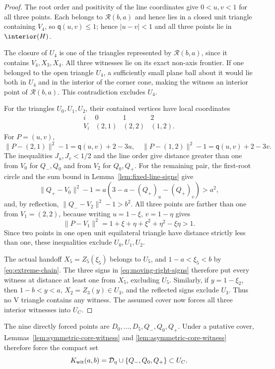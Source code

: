 \begin{proof}
The root order and positivity of the line coordinates give
$0<u,v<1$ for all three points.  Each belongs to $\mathcal R(b,a)$ and hence
lies in a closed unit triangle containing $V_4$, so
$\mathsf q(u,v)\le1$; hence
$|u-v|<1$ and all three points lie in $\interior(H)$.

The closure of $U_4$ is one of the triangles represented by
$\mathcal R(b,a)$, since it contains $V_4,X_3,X_4$.  All three witnesses lie
on its exact non-axis frontier.  If one belonged to the open triangle $U_4$,
a sufficiently small plane ball about it would lie both in $U_4$ and in the
interior of the corner cone, making the witness an interior point of
$\mathcal R(b,a)$.  This contradiction excludes $U_4$.

For the triangles $U_0,U_1,U_2$, their contained vertices have local coordinates
\[
 \begin{array}{c|ccc}
 i&0&1&2\\ \hline
 V_i&(2,1)&(2,2)&(1,2).
 \end{array}
\]
For $P=(u,v)$,
\[
 \lVert P-(2,1)\rVert^2-1=\mathsf q(u,v)+2-3u,
 \quad
 \lVert P-(1,2)\rVert^2-1=\mathsf q(u,v)+2-3v.
\]
The inequalities $J_u,J_v<1/2$ and the line order give distance greater than
one from $V_0$ for $Q_-,Q_0$ and from $V_2$ for $Q_0,Q_+$.  For the remaining
pair, the first-root circle and the sum bound in
Lemma~\ref{lem:fixed-line-signs} give
\[
 \lVert Q_+-V_0\rVert^2-1
 =a(3-a-(Q_+)_u-(Q_+)_v)>a^2,
\]
and, by reflection, $\lVert Q_--V_2\rVert^2-1>b^2$.  All three points are
farther than one from $V_1=(2,2)$, because writing $u=1-\xi$, $v=1-\eta$
gives
\[
 \lVert P-V_1\rVert^2
 =1+\xi+\eta+\xi^2+\eta^2-\xi\eta>1.
\]
Since two points in one open unit equilateral triangle have distance strictly
less than one, these inequalities exclude $U_0,U_1,U_2$.

The actual handoff $X_5=Z_5(\xi_5)$ belongs to $U_5$, and
$1-a<\xi_5<b$ by \eqref{eq:extreme-chain}.  The three signs in
\eqref{eq:moving-right-signs} therefore put every witness at distance at
least one from $X_5$, excluding $U_5$.  Similarly, if $y=1-\xi_2$, then
$1-b<y<a$, $X_2=Z_3(y)\in U_3$, and the reflected signs exclude $U_3$.
Thus no V triangle contains any witness.  The assumed cover now forces all
three interior witnesses into $U_C$.
\end{proof}

The nine directly forced points are
$D_0,\ldots,D_5,Q_-,Q_0,Q_+$.  Under a putative cover,
Lemmas~\ref{lem:symmetric-core-witness} and
\ref{lem:asymmetric-core-witness} therefore force the compact set
\begin{equation}
 K_{\rm wit}(a,b)=
 \mathcal D_\eta\cup\{Q_-,Q_0,Q_+\}
 \subset U_C.                                    \label{eq:forced-witness-set}
\end{equation}

